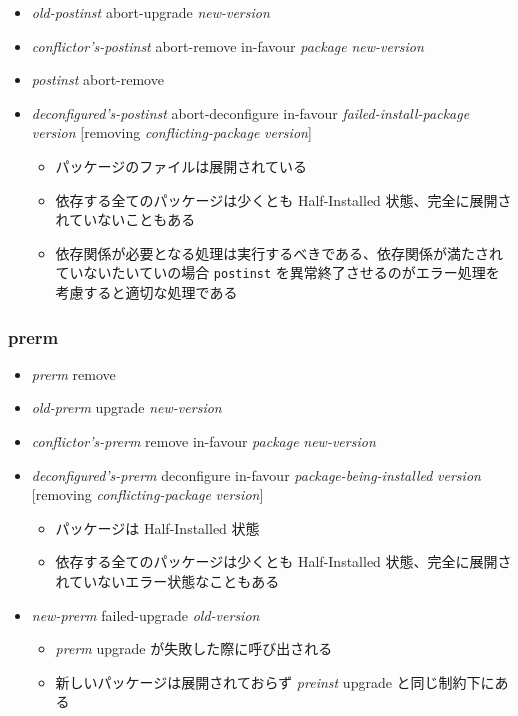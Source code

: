 \documentclass[mingoth,a4paper]{jsarticle}
\begin{document}
\begin{itemize}
\item {\it old-postinst} abort-upgrade {\it new-version}
\item {\it conflictor's-postinst} abort-remove in-favour {\it package} {\it new-version}
\item {\it postinst} abort-remove
\item {\it deconfigured's-postinst} abort-deconfigure in-favour {\it failed-install-package} {\it version} [removing {\it conflicting-package} {\it version}]
  \begin{itemize}
  \item パッケージのファイルは展開されている
  \item 依存する全てのパッケージは少くとも Half-Installed 状態、完全に展開されていないこともある
  \item 依存関係が必要となる処理は実行するべきである、依存関係が満たされていないたいていの場合 {\tt postinst} を異常終了させるのがエラー処理を考慮すると適切な処理である
  \end{itemize}
\end{itemize}


\subsubsection{prerm}

\begin{itemize}
\item {\it prerm} remove
\item {\it old-prerm} upgrade {\it new-version}
\item {\it conflictor's-prerm} remove in-favour {\it package} {\it new-version}
\item {\it deconfigured's-prerm} deconfigure in-favour {\it package-being-installed} {\it version} [removing {\it conflicting-package} {\it version}]
  \begin{itemize}
  \item パッケージは Half-Installed 状態
  \item 依存する全てのパッケージは少くとも Half-Installed 状態、完全に展開されていないエラー状態なこともある
  \end{itemize}
\end{itemize}

\begin{itemize}
\item {\it new-prerm} failed-upgrade {\it old-version}
  \begin{itemize}
  \item {\it prerm} upgrade が失敗した際に呼び出される
  \item 新しいパッケージは展開されておらず {\it preinst} upgrade と同じ制約下にある
  \end{itemize}
\end{itemize}
\end{document}
